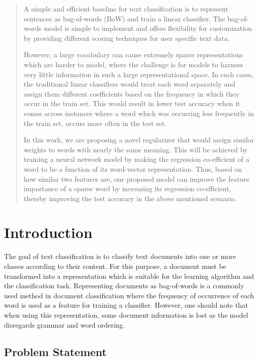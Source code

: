 \begin{abstract}
A simple and efficient baseline for text classification is to represent sentences as bag-of-words (BoW) and train a linear classifier. The bag-of-words model is simple to implement and offers flexibility for customization by providing different scoring techniques for user specific text data.

However, a large vocabulary can cause extremely sparse representations which are harder to model, where the challenge is for models to harness very little information in such a large representational space. In such cases, the traditional linear classifiers would treat each word separately and assign them different coefficients based on the frequency in which they occur in the train set. This would result in lower test accuracy when it comes across instances where a word which was occurring less frequently in the train set, occurs more often in the test set.

In this work, we are proposing a novel regularizer that would assign similar weights to words with nearly the same meaning. This will be achieved by training a neural network model by making the regression co-efficient of a word to be a function of its word-vector representation. Thus, based on how similar two features are, our proposed model can improve the feature importance of a sparse word by increasing its regression co-efficient, thereby improving the test accuracy in the above mentioned scenario.

\end{abstract}

\chapter{Introduction}

The goal of text classification is to classify text documents into one or more classes according to their content. For this purpose, a document must be transformed into a representation which is suitable for the learning algorithm and the classification task. Representing documents as bag-of-words is a commonly used method in document classification where the frequency of occurrence of each word is used as a feature for training a classifier. However, one should note that when using this representation, some document information is lost as the model disregards grammar and word ordering.

\section{Problem Statement}

